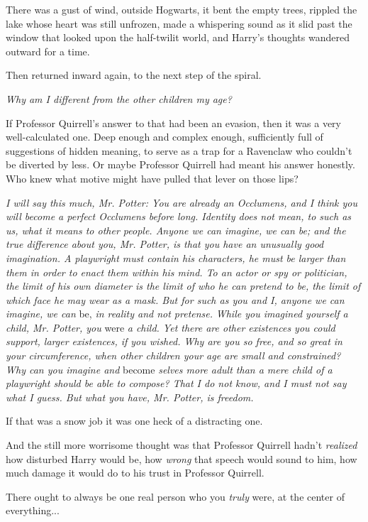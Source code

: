 There was a gust of wind, outside Hogwarts, it bent the empty trees,
rippled the lake whose heart was still unfrozen, made a whispering sound
as it slid past the window that looked upon the half-twilit world, and
Harry's thoughts wandered outward for a time.

Then returned inward again, to the next step of the spiral.

\emph{Why am I different from the other children my age?}

If Professor Quirrell's answer to that had been an evasion, then it was
a very well-calculated one. Deep enough and complex enough, sufficiently
full of suggestions of hidden meaning, to serve as a trap for a
Ravenclaw who couldn't be diverted by less. Or maybe Professor Quirrell
had meant his answer honestly. Who knew what motive might have pulled
that lever on those lips?

\emph{I will say this much, Mr. Potter: You are already an Occlumens,
and I think you will become a perfect Occlumens before long. Identity
does not mean, to such as us, what it means to other people. Anyone we
can imagine, we can be; and the true difference about you, Mr. Potter,
is that you have an unusually good imagination. A playwright must
contain his characters, he must be larger than them in order to enact
them within his mind. To an actor or spy or politician, the limit of his
own diameter is the limit of who he can pretend to be, the limit of
which face he may wear as a mask. But for such as you and I, anyone we
can imagine, we can} be, \emph{in reality and not pretense.} \emph{While
you imagined yourself a child, Mr. Potter, you} were \emph{a child. Yet
there are other existences you could support, larger existences, if you
wished. Why are you so free, and so great in your circumference, when
other children your age are small and constrained? Why can you imagine
and} become \emph{selves more adult than a mere child of a playwright
should be able to compose? That I do not know, and I must not say what I
guess. But what you have, Mr. Potter, is freedom.}

If that was a snow job it was one heck of a distracting one.

And the still more worrisome thought was that Professor Quirrell hadn't
\emph{realized} how disturbed Harry would be, how \emph{wrong} that
speech would sound to him, how much damage it would do to his trust in
Professor Quirrell.

There ought to always be one real person who you \emph{truly} were, at
the center of everything...

